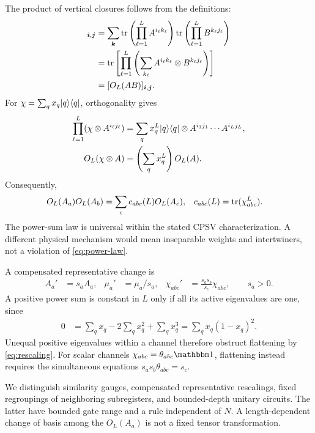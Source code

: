The product of vertical closures follows from the definitions:
\begin{align}
	[O_L(A)O_L(B)]_{\boldsymbol i,\boldsymbol j}
	 & =\sum_{\boldsymbol k}
	\tr\left(\prod_{\ell=1}^LA^{i_\ell k_\ell}\right)
	\tr\left(\prod_{\ell=1}^LB^{k_\ell j_\ell}\right)
	\nonumber                                          \\
	 & =\tr\left[\prod_{\ell=1}^L
		       \left(\sum_{k_\ell}A^{i_\ell k_\ell}\otimes
		       B^{k_\ell j_\ell}\right)\right] \\
	 & =[O_L(AB)]_{\boldsymbol i,\boldsymbol j}.
\end{align}
For $\chi=\sum_qx_q\lvert q\rangle\langle q\rvert$, orthogonality gives
\begin{align}
	\prod_{\ell=1}^L(\chi\otimes A^{i_\ell j_\ell})
	 & =\sum_qx_q^L\lvert q\rangle\langle q\rvert\otimes
	A^{i_1j_1}\cdots A^{i_Lj_L},        \\
	O_L(\chi\otimes A)
	 & =\left(\sum_qx_q^L\right)O_L(A).
\end{align}
Consequently,
\begin{align}
	O_L(A_a)O_L(A_b)
	           & =\sum_c c_{abc}(L)O_L(A_c), &
	c_{abc}(L) & =\operatorname{tr}(\chi_{abc}^L).
	\label{eq:power-law}
\end{align}
The power-sum law is universal within the stated CPSV
characterization. A different physical mechanism would mean
inseparable weights and intertwiners, not a violation of
\cref{eq:power-law}.

A compensated representative change is
\begin{align}
	A_a'        & =s_aA_a,                       &
	\mu_a'      & =\mu_a/s_a,                    &
	\chi_{abc}' & =\frac{s_as_b}{s_c}\chi_{abc},
	\qquad s_a>0.
	\label{eq:rescaling}
\end{align}
A positive power sum is constant in $L$ only if all its active
eigenvalues are one, since
\begin{align}
	0
	 & =\sum_qx_q-2\sum_qx_q^2+\sum_qx_q^3
	=\sum_qx_q(1-x_q)^2.
	\label{eq:constant-power}
\end{align}
Unequal positive eigenvalues within a channel therefore obstruct
flattening by \cref{eq:rescaling}. For scalar channels
$\chi_{abc}=\theta_{abc}\Id$, flattening instead requires the
simultaneous equations $s_as_b\theta_{abc}=s_c$.

We distinguish similarity gauges, compensated representative
rescalings, fixed regroupings of neighboring subregisters, and
bounded-depth unitary circuits. The latter have bounded gate range
and a rule independent of $N$. A length-dependent change of basis
among the $O_L(A_a)$ is not a fixed tensor transformation.

